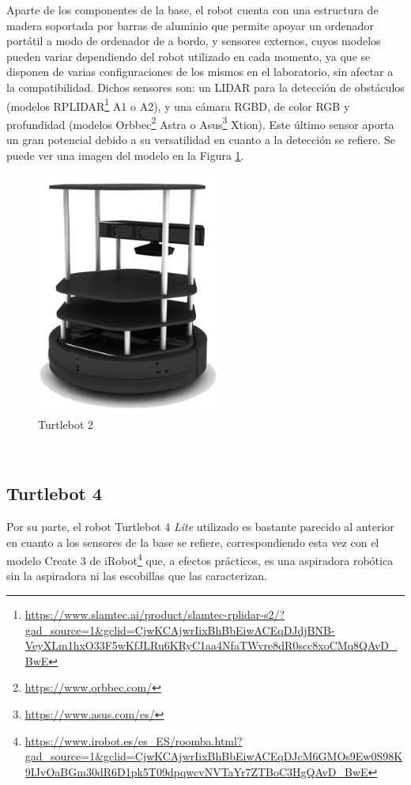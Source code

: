 Aparte de los componentes de la base, el robot cuenta con una estructura de
madera soportada por barras de aluminio que permite apoyar un ordenador
portátil a modo de ordenador de a bordo, y sensores externos, cuyos modelos
pueden variar dependiendo del robot utilizado en cada momento, ya que se
disponen de varias configuraciones de los mismos en el laboratorio, sin afectar
a la compatibilidad.
Dichos sensores son: un LIDAR para la detección de obstáculos (modelos
RPLIDAR\footnote{\url{https://www.slamtec.ai/product/slamtec-rplidar-s2/?gad_source=1&gclid=CjwKCAjwrIixBhBbEiwACEqDJdjBNB-VeyXLm1hxO33F5wKfJLRu6KRyC1aa4NfaTWvre8dR0scc8xoCMq8QAvD_BwE}}
A1 o A2), y una cámara RGBD, de color RGB y profundidad (modelos
Orbbec\footnote{\url{https://www.orbbec.com/}} Astra o
Asus\footnote{\url{https://www.asus.com/es/}} Xtion).
Este último sensor aporta un gran potencial debido a su versatilidad en cuanto a
la detección se refiere.
Se puede ver una imagen del modelo en la Figura \ref{fig:turtlebot2}.
\\

\begin{figure} [h!]
  \begin{center}
    \includegraphics[width=6cm]{figs/turtlebot2}
  \end{center}
  \caption{Turtlebot 2 \citep{turtlebot4}}
  \label{fig:turtlebot2}
\end{figure}\


\subsection{Turtlebot 4}
\label{sec:turtlebot4}

Por su parte, el robot Turtlebot 4 \textit{Lite} utilizado es bastante parecido
al anterior en cuanto a los sensores de la base se refiere, correspondiendo esta
vez con el modelo Create 3 de iRobot\footnote{
\url{https://www.irobot.es/es_ES/roomba.html?gad_source=1&gclid=CjwKCAjwrIixBhBbEiwACEqDJcM6GMOs9Ew0S98K9IJvOaBGm30dR6D1pk5T09dpqwcvNVTaYr7ZTBoC3HgQAvD_BwE}}
que, a efectos prácticos, es una aspiradora robótica sin la aspiradora ni
las escobillas que las caracterizan.
\\

